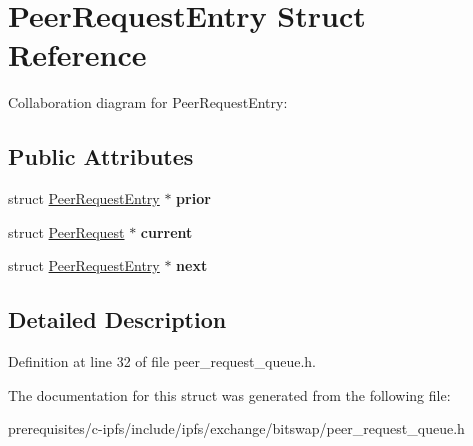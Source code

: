 \hypertarget{struct_peer_request_entry}{}\section{Peer\+Request\+Entry Struct Reference}
\label{struct_peer_request_entry}


Collaboration diagram for Peer\+Request\+Entry\+:
\subsection*{Public Attributes}
\begin{DoxyCompactItemize}
\item 
\mbox{\label{struct_peer_request_entry_a51f1ac5383c97029b1fc9ab29ef7c746}} 
struct \mbox{\hyperlink{struct_peer_request_entry}{Peer\+Request\+Entry}} $\ast$ {\bfseries prior}
\item 
\mbox{\label{struct_peer_request_entry_a1844ba42ac6b6d092c1f9f224edbf22c}} 
struct \mbox{\hyperlink{struct_peer_request}{Peer\+Request}} $\ast$ {\bfseries current}
\item 
\mbox{\label{struct_peer_request_entry_aadea421aa1289ff6658b23502e3aecbd}} 
struct \mbox{\hyperlink{struct_peer_request_entry}{Peer\+Request\+Entry}} $\ast$ {\bfseries next}
\end{DoxyCompactItemize}


\subsection{Detailed Description}


Definition at line 32 of file peer\+\_\+request\+\_\+queue.\+h.



The documentation for this struct was generated from the following file\+:\begin{DoxyCompactItemize}
\item 
prerequisites/c-\/ipfs/include/ipfs/exchange/bitswap/peer\+\_\+request\+\_\+queue.\+h\end{DoxyCompactItemize}
